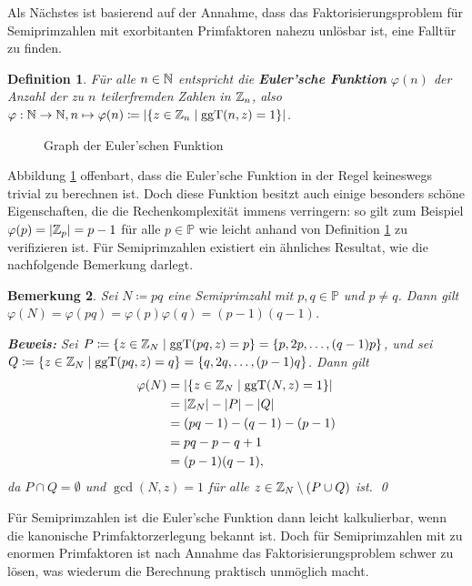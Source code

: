 \documentclass{paper}
\theoremstyle{classic}
\newtheorem{definition}{Definition}[section]
\newtheorem{remark}[definition]{Bemerkung}
\begin{document}
Als Nächstes ist basierend auf der Annahme, dass das Faktorisierungsproblem für Semiprimzahlen mit exorbitanten Primfaktoren nahezu unlösbar ist, eine Falltür zu finden.
\begin{definition}
\label{def:2.2}
Für alle \(n \in \N\) entspricht die \textbf{Euler'sche Funktion} \(\varphi(n)\) der Anzahl der zu \(n\) teilerfremden Zahlen in \(\Z_n\), also \(\varphi : \N \rightarrow \N, n \mapsto \varphi(n) \coloneqq \left| \{z \in \Z_n \mid \gcd(n,z) = 1\} \right|\).
\end{definition}
\begin{figure}[ht]\centering
\caption{Graph der Euler'schen Funktion}
\label{fig:1}
\begin{tikzpicture}

\end{tikzpicture}
\end{figure}
Abbildung \ref{fig:1} offenbart, dass die Euler'sche Funktion in der Regel keineswegs trivial zu berechnen ist. Doch diese Funktion besitzt auch einige besonders schöne Eigenschaften, die die Rechenkomplexität immens verringern: so gilt zum Beispiel \(\varphi(p) = \left| \Z_p \right| = p - 1\) für alle \(p \in \mathbb{P}\) wie leicht anhand von Definition \ref{def:2.2} zu verifizieren ist. Für Semiprimzahlen existiert ein ähnliches Resultat, wie die nachfolgende Bemerkung darlegt.
\begin{remark}
\label{rem:2.3}
Sei \(N \coloneqq pq\) eine Semiprimzahl mit \(p,q \in \mathbb{P}\) und \(p \neq q\). Dann gilt \(\varphi(N) = \varphi(pq) = \varphi(p)\varphi(q) = (p - 1)(q - 1)\).

\textbf{Beweis:} Sei \(P \coloneqq \{z \in \Z_N \mid \gcd(pq,z) = p\} = \{p,2p,\dots,(q - 1)p\}\), und sei \(Q \coloneqq \{z \in \Z_{N} \mid \gcd(pq,z) = q\} = \{q,2q,\dots,(p - 1)q\}\). Dann gilt
\begin{align*}
\varphi(N) &= \left| \{z \in \Z_N \mid \gcd(N,z) = 1\} \right| \\
           &= \left| \Z_N \right| - \left| P \right| - \left| Q \right| \\
           &= (pq - 1) - (q - 1) - (p - 1) \\
           &= pq - p - q + 1 \\
           &= (p - 1) (q - 1),
\end{align*}
da \(P \cap Q = \emptyset\) und \(\gcd(N,z) = 1\) für alle \(z \in \Z_N \setminus (P \cup Q)\) ist. \qed
\end{remark}
Für Semiprimzahlen ist die Euler'sche Funktion dann leicht kalkulierbar, wenn die kanonische Primfaktorzerlegung bekannt ist. Doch für Semiprimzahlen mit zu enormen Primfaktoren ist nach Annahme das Faktorisierungsproblem schwer zu lösen, was wiederum die Berechnung praktisch unmöglich macht.
\end{document}

